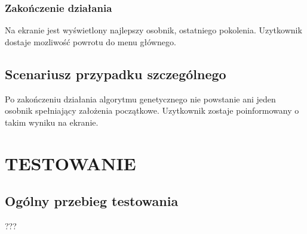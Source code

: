 \documentclass{article}
\begin{document}
\subsubsection{Zakończenie działania}
Na ekranie jest wyświetlony najlepszy osobnik, ostatniego pokolenia. Uzytkownik dostaje mozliwość powrotu do menu głównego. \par

\subsection{Scenariusz przypadku szczeg\'olnego}
Po zakończeniu działania algorytmu genetycznego nie powstanie ani jeden osobnik spełniający założenia początkowe. Uzytkownik zostaje poinformowany o takim wyniku na ekranie.

\section{TESTOWANIE}
\subsection{Og\'olny przebieg testowania}
???
\end{document}
